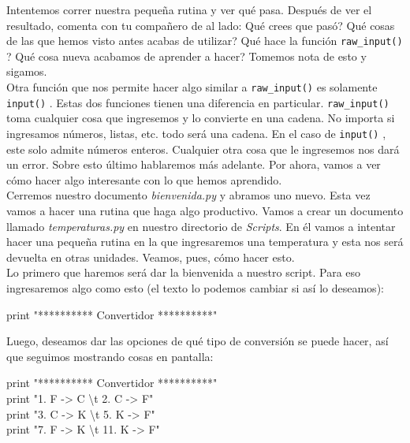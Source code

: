 \documentclass[10pt,letterpaper]{article}
\newcommand{\inlinecode}[1]{
\colorbox{light-gray}{\texttt{#1}}
}
\newenvironment{Code}
{
\begin{lrbox}{\selvestebox}%
\begin{minipage}{\dimexpr\columnwidth-2\fboxsep\relax}
\fontfamily{\ttdefault}\selectfont
}
{\end{minipage}\end{lrbox}%
\begin{center}
\colorbox{light-gray}{\usebox{\selvestebox}}
\end{center}
}
\begin{document}
Intentemos correr nuestra peque\~na rutina y ver qu\'e pasa. Despu\'es de ver el resultado, comenta con tu compa\~nero de al lado: Qu\'e crees que pas\'o? Qu\'e cosas de las que hemos visto antes acabas de utilizar? Qu\'e hace la funci\'on \inlinecode{raw\_input()}? Qu\'e cosa nueva acabamos de aprender a hacer? Tomemos nota de esto y sigamos.\\

Otra funci\'on que nos permite hacer algo similar a \inlinecode{raw\_input()} es solamente \inlinecode{input()}. Estas dos funciones tienen una diferencia en particular. \inlinecode{raw\_input()} toma cualquier cosa que ingresemos y lo convierte en una cadena. No importa si ingresamos n\'umeros, listas, etc. todo ser\'a una cadena. En el caso de \inlinecode{input()}, este solo admite n\'umeros enteros. Cualquier otra cosa que le ingresemos nos dar\'a un error. Sobre esto \'ultimo hablaremos m\'as adelante. Por ahora, vamos a ver c\'omo hacer algo interesante con lo que hemos aprendido.\\

Cerremos nuestro documento \textit{bienvenida.py} y abramos uno nuevo. Esta vez vamos a hacer una rutina que haga algo productivo. Vamos a crear un documento llamado \textit{temperaturas.py} en nuestro directorio de \textit{Scripts}. En \'el vamos a intentar hacer una peque\~na rutina en la que ingresaremos una temperatura y esta nos ser\'a devuelta en otras unidades. Veamos, pues, c\'omo hacer esto.\\

\noindent Lo primero que haremos ser\'a dar la bienvenida a nuestro script. Para eso ingresaremos algo como esto (el texto lo podemos cambiar si as\'i lo deseamos):

\begin{Code}
print "********** Convertidor **********"
\end{Code}

\noindent Luego, deseamos dar las opciones de qu\'e tipo de conversi\'on se puede hacer, as\'i que seguimos mostrando cosas en pantalla:

\begin{Code}
print "********** Convertidor **********"\\
print "1. F -> C \textbackslash t  2. C -> F"\\
print "3. C -> K \textbackslash t  5. K -> F"\\
print "7. F -> K \textbackslash t 11. K -> F"
\end{Code}
\end{document}

